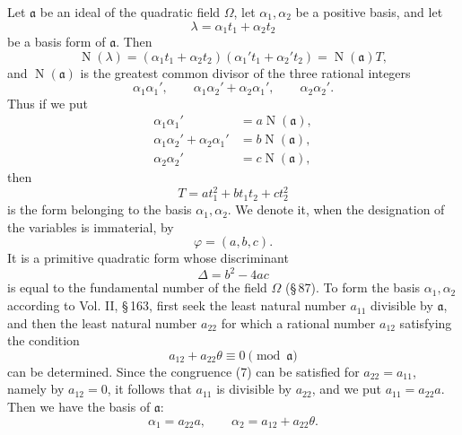 \documentclass[11pt]{article}
\newcommand{\Norm}{\operatorname{N}}
\begin{document}
Let $\mathfrak a$ be an ideal of the quadratic field $\Omega$, let $\alpha_1,\alpha_2$ be a positive basis, and let
\begin{equation}
 \lambda=\alpha_1t_1+\alpha_2t_2
\tag{1}
\end{equation}
be a basis form of $\mathfrak a$. Then
\begin{equation}
 \Norm(\lambda)=(\alpha_1t_1+\alpha_2t_2)(\alpha_1't_1+\alpha_2't_2)=\Norm(\mathfrak a)T,
\tag{2}
\end{equation}
and $\Norm(\mathfrak a)$ is the greatest common divisor of the three rational integers
\[
 \alpha_1\alpha_1',\qquad \alpha_1\alpha_2'+\alpha_2\alpha_1',\qquad \alpha_2\alpha_2'.
\]
Thus if we put
\begin{equation}
\begin{aligned}
\alpha_1\alpha_1'&=a\Norm(\mathfrak a),\\
\alpha_1\alpha_2'+\alpha_2\alpha_1'&=b\Norm(\mathfrak a),\\
\alpha_2\alpha_2'&=c\Norm(\mathfrak a),
\end{aligned}
\tag{3}
\end{equation}
then
\begin{equation}
T=at_1^2+bt_1t_2+ct_2^2
\tag{4}
\end{equation}
is the form belonging to the basis $\alpha_1,\alpha_2$. We denote it, when the designation of the variables is immaterial, by
\begin{equation}
 \varphi=(a,b,c).
\tag{5}
\end{equation}
It is a primitive quadratic form whose discriminant
\begin{equation}
 \Delta=b^2-4ac
\tag{6}
\end{equation}
is equal to the fundamental number of the field $\Omega$ (\S\,87). To form the basis $\alpha_1,\alpha_2$ according to Vol. II, \S\,163, first seek the least natural number $a_{11}$ divisible by $\mathfrak a$, and then the least natural number $a_{22}$ for which a rational number $a_{12}$ satisfying the condition
\begin{equation}
 a_{12}+a_{22}\theta\equiv0\pmod{\mathfrak a}
\tag{7}
\end{equation}
can be determined. Since the congruence (7) can be satisfied for $a_{22}=a_{11}$, namely by $a_{12}=0$, it follows that $a_{11}$ is divisible by $a_{22}$, and we put $a_{11}=a_{22}a$. Then we have the basis of $\mathfrak a$:
\begin{equation}
 \alpha_1=a_{22}a,
 \qquad
 \alpha_2=a_{12}+a_{22}\theta.
\tag{8}
\end{equation}
\end{document}
